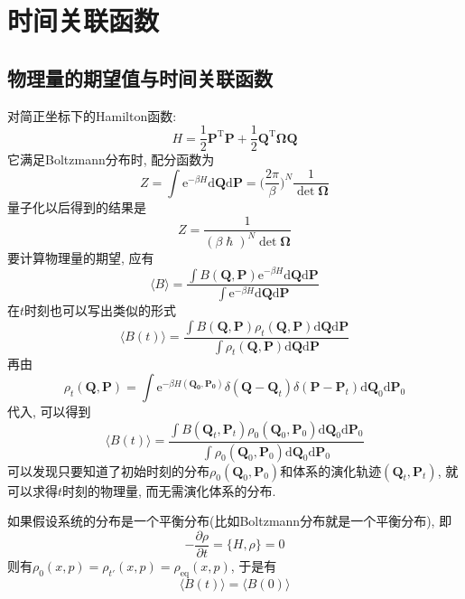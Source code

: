 \chapter{时间关联函数}
    \section{物理量的期望值与时间关联函数}

    对简正坐标下的Hamilton函数:
    \begin{equation}
        H = \frac 12 \bm{P}^\mathrm{T}\bm{P} + \frac 12 \bm{Q}^\mathrm{T} \bm{\Omega Q}
    \end{equation}
    它满足Boltzmann分布时, 配分函数为
    \begin{equation}
        Z = \int \mathrm{e}^{-\beta H} \mathrm{d}\bm{Q}\mathrm{d}\bm{P} = \bigg(\frac {2\pi}{\beta}\bigg)^N \frac 1{\det \bm{\Omega}}
    \end{equation}
    量子化以后得到的结果是
    \begin{equation}
        Z = \frac 1{(\beta \hslash)^N \det \bm{\Omega}}
    \end{equation}
    要计算物理量的期望, 应有
    \begin{equation}
        \langle B \rangle = \frac {\int B(\bm{Q,P})\mathrm{e}^{-\beta H} \mathrm{d}\bm{Q}\mathrm{d}\bm{P}}{\int \mathrm{e}^{-\beta H} \mathrm{d}\bm{Q}\mathrm{d}\bm{P}}
    \end{equation}
    在$t$时刻也可以写出类似的形式
    \begin{equation}
        \langle B(t) \rangle = \frac {\int B(\bm{Q,P}) \rho_t(\bm{Q,P}) \mathrm{d}\bm{Q}\mathrm{d}\bm{P}}{\int \rho_t(\bm{Q,P}) \mathrm{d}\bm{Q}\mathrm{d}\bm{P}}
    \end{equation}
    再由
    \begin{equation}
        \rho_t (\bm{Q,P}) = \int \mathrm{e}^{-\beta H(\bm{Q_0,P_0})} \delta(\bm{Q-Q}_t) \delta(\bm{P-P}_t) \mathrm{d}\bm{Q}_0\mathrm{d}\bm{P}_0
    \end{equation}
    代入, 可以得到
    \begin{equation}
        \langle B(t) \rangle = \frac {\int B(\bm{Q}_t,\bm{P}_t) \rho_0(\bm{Q}_0,\bm{P}_0) \mathrm{d}\bm{Q}_0\mathrm{d}\bm{P}_0}{\int \rho_0(\bm{Q}_0,\bm{P}_0) \mathrm{d}\bm{Q}_0\mathrm{d}\bm{P}_0}
    \end{equation}
    可以发现只要知道了初始时刻的分布$\rho_0(\bm{Q}_0,\bm{P}_0)$和体系的演化轨迹$(\bm{Q}_t,\bm{P}_t)$, 就可以求得$t$时刻的物理量, 而无需演化体系的分布. 

    如果假设系统的分布是一个平衡分布(比如Boltzmann分布就是一个平衡分布), 即
    \begin{equation}
        - \frac {\partial \rho}{\partial t} = \{ H, \rho\} = 0
    \end{equation}
    则有$\rho_0(x,p) = \rho_{t'}(x, p) = \rho_{\mathrm{eq}}(x, p)$, 于是有
    \begin{equation}
        \langle B(t) \rangle = \langle B(0) \rangle
    \end{equation}

